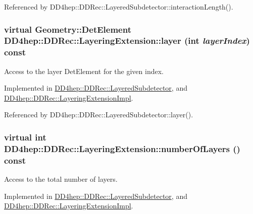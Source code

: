 Referenced by DD4hep::DDRec::LayeredSubdetector::interactionLength().\hypertarget{class_d_d4hep_1_1_d_d_rec_1_1_layering_extension_a080be80c3277feaa59828b829d29c747}{
\subsubsection[{layer}]{\setlength{\rightskip}{0pt plus 5cm}virtual {\bf Geometry::DetElement} DD4hep::DDRec::LayeringExtension::layer (int {\em layerIndex}) const}}
\label{class_d_d4hep_1_1_d_d_rec_1_1_layering_extension_a080be80c3277feaa59828b829d29c747}


Access to the layer DetElement for the given index. 

Implemented in \hyperlink{class_d_d4hep_1_1_d_d_rec_1_1_layered_subdetector_a3a6258cde1c1acad749e688e9e113bcb}{DD4hep::DDRec::LayeredSubdetector}, and \hyperlink{class_d_d4hep_1_1_d_d_rec_1_1_layering_extension_impl_a2c672b63b63396c9751044089a13eea3}{DD4hep::DDRec::LayeringExtensionImpl}.

Referenced by DD4hep::DDRec::LayeredSubdetector::layer().\hypertarget{class_d_d4hep_1_1_d_d_rec_1_1_layering_extension_a2a0ee0e2bdb875de6573591e2648e446}{
\subsubsection[{numberOfLayers}]{\setlength{\rightskip}{0pt plus 5cm}virtual int DD4hep::DDRec::LayeringExtension::numberOfLayers () const}}
\label{class_d_d4hep_1_1_d_d_rec_1_1_layering_extension_a2a0ee0e2bdb875de6573591e2648e446}


Access to the total number of layers. 

Implemented in \hyperlink{class_d_d4hep_1_1_d_d_rec_1_1_layered_subdetector_adef08a11c41ecdb0595fbe4bd1bd0851}{DD4hep::DDRec::LayeredSubdetector}, and \hyperlink{class_d_d4hep_1_1_d_d_rec_1_1_layering_extension_impl_a531a938c96eb801d0aa9bc540fd7ae1d}{DD4hep::DDRec::LayeringExtensionImpl}.


